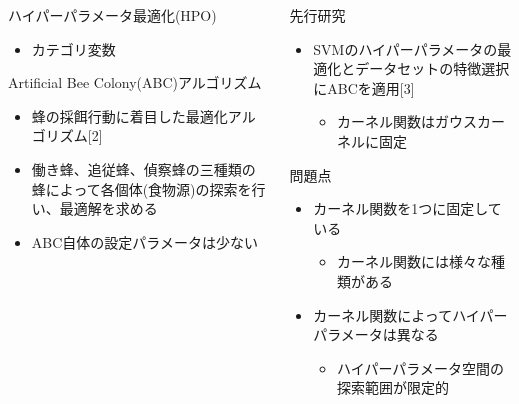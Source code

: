 \documentclass[12pt, cjk, dvipdfmx]{beamer}
\begin{document}
\begin{frame}
\begin{columns}[t]
\begin{column}{0.490\linewidth}
\begin{mybox}{ハイパーパラメータ最適化(HPO)}
\begin{itemize}
\begin{itemize}
                  \item カテゴリ変数
                \end{itemize}
              \end{itemize}
            \end{mybox}
            \begin{mybox}{Artificial Bee Colony(ABC)アルゴリズム}
              \begin{itemize}
                \item 蜂の採餌行動に着目した最適化アルゴリズム[2]
                \item 働き蜂、追従蜂、偵察蜂の三種類の蜂によって各個体(食物源)の探索を行い、最適解を求める
                \item ABC自体の設定パラメータは少ない
              \end{itemize}
          \end{mybox}
        \end{column}
        \begin{column}{0.490\linewidth}
          
          \begin{mybox}{先行研究}
            \begin{itemize}
            \item SVMのハイパーパラメータの最適化とデータセットの特徴選択にABCを適用[3]
            \begin{itemize}
              \item カーネル関数はガウスカーネルに固定
            \end{itemize}
            \end{itemize}
          \end{mybox}
          \begin{mybox}{問題点}
            \begin{itemize}
            \item カーネル関数を1つに固定している
             \begin{itemize}
            \item  カーネル関数には様々な種類がある
             \end{itemize}
            \item カーネル関数によってハイパーパラメータは異なる
               \begin{itemize}
                  \item ハイパーパラメータ空間の探索範囲が限定的
               \end{itemize}
            \end{itemize}
          \end{mybox}
           

\end{column}
\end{columns}
\end{frame}
\end{document}
